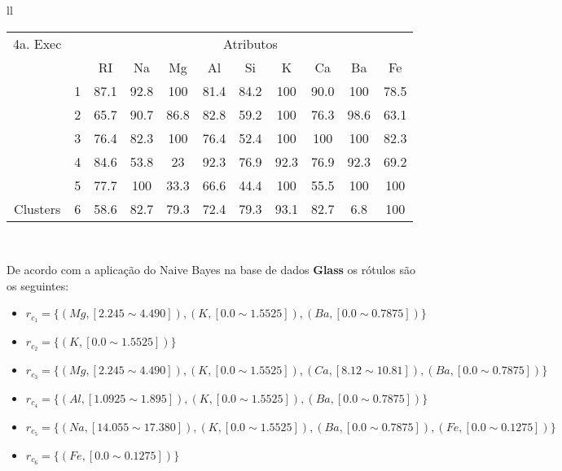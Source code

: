 \begin{table}[!ht]
\begin{tabular}{ll}
       \small\addtolength{\tabcolsep}{-5pt}
    \begin{tabular}{|cl|c|c|c|c|c|c|c|c|c|}
        \hline \hline
            {\tiny 4a. Exec}     &   & \multicolumn{9}{c|}{\tiny Atributos}                                               \\ \cline{3-11} 
       \multicolumn{1}{|l}{}                            &   & RI    & Na    & Mg  & Al   & Si   & K   & Ca   & Ba  & Fe             \\ \hline
        \multicolumn{1}{|c|}{}                           & 1 & 87.1 & 92.8  & 100 & 81.4 & 84.2 & 100 & 90.0 & 100 & 78.5 \\ \cline{2-11} 
        \multicolumn{1}{|c|}{}                           & 2 & 65.7 & 90.7  & 86.8& 82.8 & 59.2 & 100  & 76.3 &98.6 & 63.1  \\ \cline{2-11} 
        \multicolumn{1}{|c|}{}                           & 3 & 76.4 & 82.3  & 100  & 76.4 & 52.4 & 100  & 100 & 100 & 82.3  \\ \cline{2-11}
        \multicolumn{1}{|c|}{}                           & 4 & 84.6 & 53.8  & 23  & 92.3 & 76.9 & 92.3  & 76.9 & 92.3 & 69.2  \\ \cline{2-11}
        \multicolumn{1}{|c|}{}                           & 5 & 77.7 & 100   & 33.3  & 66.6 & 44.4 & 100  & 55.5 & 100 & 100  \\ \cline{2-11}
        \multicolumn{1}{|c|}{\multirow{-3}{*}{\tiny Clusters}} & 6 & 58.6   & 82.7& 79.3  & 72.4 & 79.3 & 93.1  & 82.7 & 6.8 & 100  \\ 
        
        \hline
      \end{tabular}
   \\
 
 \end{tabular}
 \label{tab:execucoes:glass:nb}
\end{table}


De acordo com a aplicação do Naive Bayes na base de dados \textbf{Glass} os rótulos são os seguintes:
\begin{itemize}[noitemsep]
 \item ${r_{c_1}=\{ (Mg, [ 2.245 \sim 4.490 ]), (K,[ 0.0 \sim 1.5525 ] ), (Ba,[ 0.0 \sim 0.7875 ] ) \} }$  
 \item ${r_{c_2}=\{ (K,[ 0.0 \sim 1.5525 ] ) \} }$
 \item ${r_{c_3}=\{ (Mg, [ 2.245 \sim 4.490 ]), (K,[ 0.0 \sim 1.5525 ] ), (Ca,[ 8.12 \sim 10.81 ] ), (Ba,[ 0.0 \sim 0.7875 ] ) \} }$  
 \item ${r_{c_4}=\{(Al,[ 1.0925 \sim 1.895 ] ), (K,[ 0.0 \sim 1.5525 ] ), (Ba,[ 0.0 \sim 0.7875 ] ) \} }$
 \item ${r_{c_5}=\{ (Na,[ 14.055 \sim 17.380 ] ), (K,[ 0.0 \sim 1.5525 ] ), (Ba,[ 0.0 \sim 0.7875 ] ), (Fe,[ 0.0 \sim 0.1275 ] ) \} }$
 \item ${r_{c_6}=\{ (Fe,[ 0.0 \sim 0.1275 ] ) \} }$
\end{itemize}


